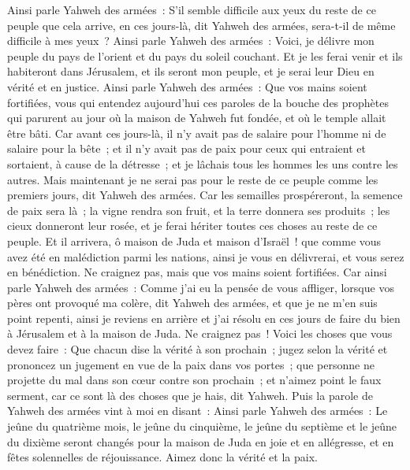 \begin{multicols}{2}
Ainsi parle Yahweh des armées~: S'il semble difficile aux yeux du reste de ce peuple que cela arrive, en ces jours-là, dit Yahweh des armées, sera-t-il de même difficile à mes yeux~?
Ainsi parle Yahweh des armées~: Voici, je délivre mon peuple du pays de l'orient et du pays du soleil couchant.
Et je les ferai venir et ils habiteront dans Jérusalem, et ils seront mon peuple, et je serai leur Dieu en vérité et en justice.
Ainsi parle Yahweh des armées~: Que vos mains soient fortifiées, vous qui entendez aujourd'hui ces paroles de la bouche des prophètes qui parurent au jour où la maison de Yahweh fut fondée, et où le temple allait être bâti.
Car avant ces jours-là, il n'y avait pas de salaire pour l'homme ni de salaire pour la bête~; et il n'y avait pas de paix pour ceux qui entraient et sortaient, à cause de la détresse~; et je lâchais tous les hommes les uns contre les autres.
Mais maintenant je ne serai pas pour le reste de ce peuple comme les premiers jours, dit Yahweh des armées.
Car les semailles prospéreront, la semence de paix sera là~; la vigne rendra son fruit, et la terre donnera ses produits~; les cieux donneront leur rosée, et je ferai hériter toutes ces choses au reste de ce peuple.
Et il arrivera, ô maison de Juda et maison d'Israël~! que comme vous avez été en malédiction parmi les nations, ainsi je vous en délivrerai, et vous serez en bénédiction. Ne craignez pas, mais que vos mains soient fortifiées.
Car ainsi parle Yahweh des armées~: Comme j'ai eu la pensée de vous affliger, lorsque vos pères ont provoqué ma colère, dit Yahweh des armées, et que je ne m'en suis point repenti,
ainsi je reviens en arrière et j'ai résolu en ces jours de faire du bien à Jérusalem et à la maison de Juda. Ne craignez pas~!
Voici les choses que vous devez faire~: Que chacun dise la vérité à son prochain~; jugez selon la vérité et prononcez un jugement en vue de la paix dans vos portes~;
que personne ne projette du mal dans son cœur contre son prochain~; et n'aimez point le faux serment, car ce sont là des choses que je hais, dit Yahweh.
Puis la parole de Yahweh des armées vint à moi en disant~:
Ainsi parle Yahweh des armées~: Le jeûne du quatrième mois, le jeûne du cinquième, le jeûne du septième et le jeûne du dixième seront changés pour la maison de Juda en joie et en allégresse, et en fêtes solennelles de réjouissance. Aimez donc la vérité et la paix.

\end{multicols}
